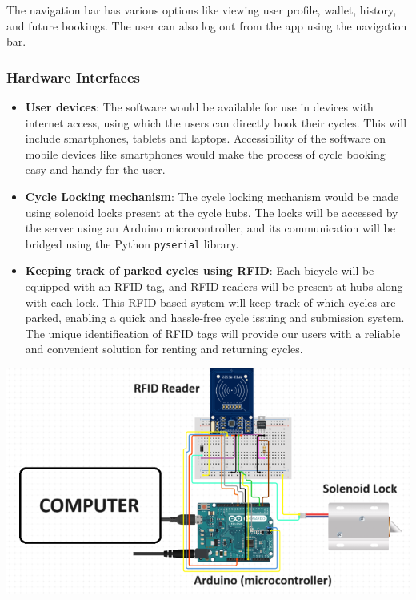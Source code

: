 \documentclass[11pt]{article}
\begin{document}
The navigation bar has various options like viewing user profile, wallet, history, and future bookings. The user can also log out from the app using the navigation bar.
\subsubsection{Hardware Interfaces}
\begin{itemize}
    \item \textbf{User devices}: The software would be available for use in devices with internet access, using which the users can directly book their cycles. This will include smartphones, tablets and laptops. Accessibility of the software on mobile devices like smartphones would make the process of cycle booking easy and handy for the user.
    \item \textbf{Cycle Locking mechanism}: The cycle locking mechanism would be made using solenoid locks present at the cycle hubs. The locks will be accessed by the server using an Arduino microcontroller, and its communication will be bridged using the Python \texttt{pyserial} library.
    \item \textbf{Keeping track of parked cycles using RFID}: Each bicycle will be equipped with an RFID tag, and RFID readers will be present at hubs along with each lock. This RFID-based system will keep track of which cycles are parked, enabling a quick and hassle-free cycle issuing and submission system. The unique identification of RFID tags will provide our users with a reliable and convenient solution for renting and returning cycles.
\end{itemize}
\begin{center}
    \includegraphics*[scale=0.75]{rfid-img.png}
\end{center}
\end{document}
